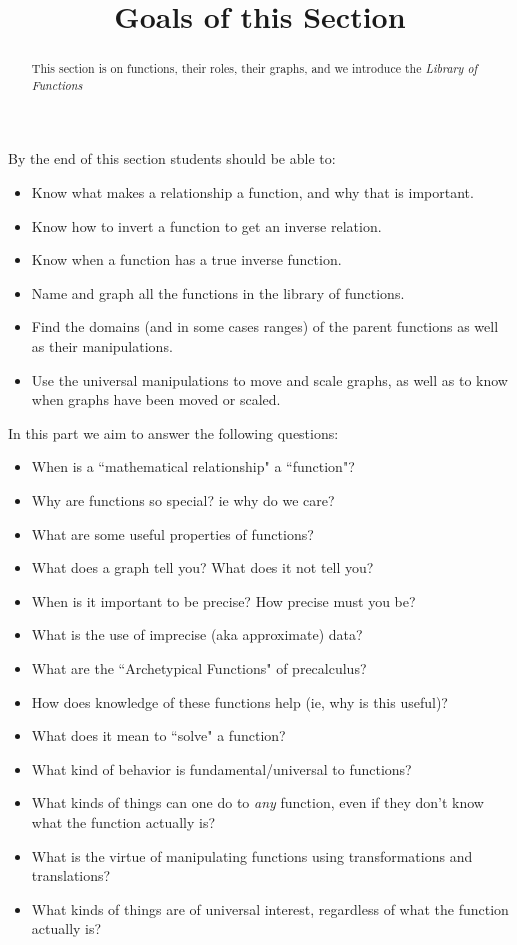\documentclass{ximeraXloud}
\title{Goals of this Section}
\begin{document}
\begin{abstract}
    This section is on functions, their roles, their graphs, and we introduce the \textit{Library of Functions}
\end{abstract}
\maketitle
By the end of this section students should be able to:

\begin{itemize}
    \item Know what makes a relationship a function, and why that is important.
    \item Know how to invert a function to get an inverse relation.
    \item Know when a function has a true inverse function.
    \item Name and graph all the functions in the library of functions.
    \item Find the domains (and in some cases ranges) of the parent functions as well as their manipulations.
    \item Use the universal manipulations to move and scale graphs, as well as to know when graphs have been moved or scaled.
\end{itemize}

In this part we aim to answer the following questions:

\begin{itemize}
    \item When is a ``mathematical relationship" a ``function"?
    \item Why are functions so special? ie why do we care?
    \item What are some useful properties of functions?
    \item What does a graph tell you? What does it not tell you?
    \item When is it important to be precise? How precise must you be?
    \item What is the use of imprecise (aka approximate) data?
    \item What are the ``Archetypical Functions" of precalculus?
    \item How does knowledge of these functions help (ie, why is this useful)?
    \item What does it mean to ``solve" a function?
    \item What kind of behavior is fundamental/universal to functions?
    \item What kinds of things can one do to \emph{any} function, even if they don't know what the function actually is?
    \item What is the virtue of manipulating functions using transformations and translations?
    \item What kinds of things are of universal interest, regardless of what the function actually is?
\end{itemize}
\end{document}

